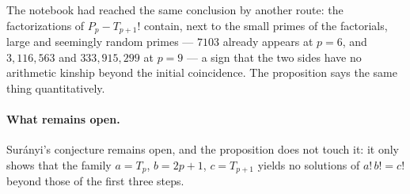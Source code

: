The notebook had reached the same conclusion by another route: the
factorizations of $P_p-T_{p+1}!$ contain, next to the small primes of the
factorials, large and seemingly random primes --- $7103$ already appears at $p=6$, and
$3{,}116{,}563$ and $333{,}915{,}299$ at $p=9$ --- a sign that the two sides have no
arithmetic kinship beyond the initial coincidence. The proposition says the
same thing quantitatively.

\paragraph{What remains open.}
Sur\'anyi's conjecture remains open, and the proposition does not touch it: it
only shows that the family $a=T_p$, $b=2p+1$, $c=T_{p+1}$ yields no solutions
of $a!\,b!=c!$ beyond those of the first three steps.
